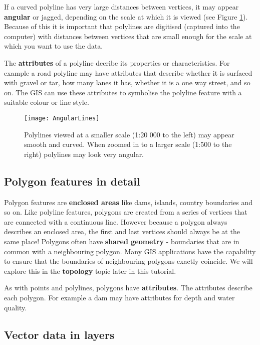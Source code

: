 If a curved polyline has very large distances between vertices, it may appear
\textbf{angular} or jagged, depending on the scale at which it is viewed
(see Figure \ref{fig:angularlines}). Because of this it is important that
polylines are digitised (captured into the computer) with distances between
vertices that are small enough for the scale at which you want to use the data.

The \textbf{attributes} of a polyline decribe its properties or
characteristics. For example a road polyline may have attributes that
describe whether it is surfaced with gravel or tar, how many lanes it has,
whether it is a one way street, and so on. The GIS can use these attributes
to symbolise the polyline feature with a suitable colour or line style.

\begin{figure}[ht]
   \begin{center}
   \caption{Polylines viewed at a smaller scale (1:20 000 to the left) may
appear smooth and curved. When zoomed in to a larger scale (1:500 to the
right) polylines may look very angular.}
\label{fig:angularlines}\smallskip
   \texttt{[image: AngularLines]}
\end{center}
\end{figure}

\subsection{Polygon features in detail}\label{subsec:polyfeature}

Polygon features are \textbf{enclosed areas} like dams, islands, country
boundaries and so on. Like polyline features, polygons are created from a
series of
vertices that are connected with a continuous line. However because a polygon
always describes an enclosed area, the first and last vertices should always
be at the same place! Polygons often have \textbf{shared geometry} -
boundaries that
are in common with a neighbouring polygon. Many GIS applications have the
capability to ensure that the boundaries of neighbouring polygons exactly
coincide. We will explore this in the \textbf{topology} topic later in this
tutorial.

As with points and polylines, polygons have \textbf{attributes}. The
attributes
describe each polygon. For example a dam may have attributes for depth and
water quality. 

\subsection{Vector data in layers}\label{subsec:vectinlayer}

